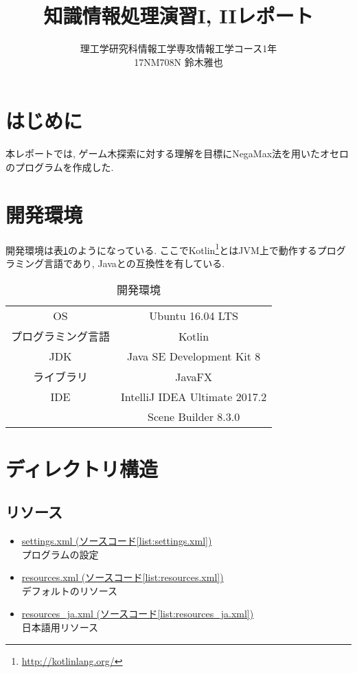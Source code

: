\documentclass[uplatex,titlepage]{jsarticle}
\title{知識情報処理演習I, IIレポート}
\author{理工学研究科情報工学専攻情報工学コース1年\\17NM708N 鈴木雅也}
\begin{document}
\maketitle
\section{はじめに}
本レポートでは, ゲーム木探索に対する理解を目標にNegaMax法を用いたオセロのプログラムを作成した.

\section{開発環境}
開発環境は表\ref{tab:開発環境}のようになっている. ここでKotlin\footnote{\url{http://kotlinlang.org/}}とはJVM上で動作するプログラミング言語であり, Javaとの互換性を有している.
\begin{table}[h]
\begin{center}
\label{tab:開発環境}
\caption{開発環境}
\begin{tabular}{c|c}
\hline
\hline
OS & Ubuntu 16.04 LTS \\
プログラミング言語 & Kotlin \\
JDK & Java SE Development Kit 8 \\
ライブラリ & JavaFX \\
IDE & IntelliJ IDEA Ultimate 2017.2 \\
 & Scene Builder 8.3.0 \\ \hline
\end{tabular}
\end{center}
\end{table}


\section{ディレクトリ構造}
\subsection{リソース}
\begin{itemize}
\item \underline{settings.xml (ソースコード\ref{list:settings.xml})}\\
プログラムの設定
\item \underline{resources.xml (ソースコード\ref{list:resources.xml})}\\
デフォルトのリソース
\item \underline{resources\_ja.xml (ソースコード\ref{list:resources_ja.xml})}\\
日本語用リソース
\end{itemize}
\end{document}
